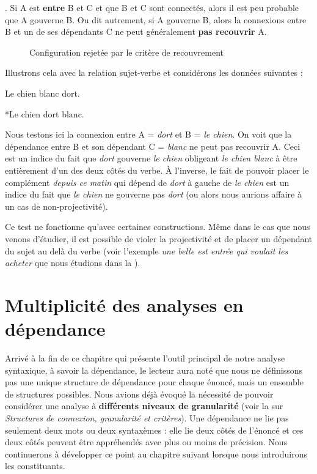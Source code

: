 \begin{styleLivreImportant}
. Si A est \textbf{entre} B et C et que B et C sont connectés, alors il est peu probable que A gouverne B. Ou dit autrement, si A gouverne B, alors la connexions entre B et un de ses dépendants C ne peut généralement \textbf{pas recouvrir} A.
\end{styleLivreImportant}

\begin{figure}

\caption{\label{fig:}Configuration rejetée par le critère de recouvrement}

\end{figure}

Illustrons cela avec la relation sujet-verbe et considérons les données suivantes :

\ea
    {Le chien blanc dort.}
    \z

    \ea
    *{Le chien dort blanc.}
\z

\z

\z

Nous testons ici la connexion entre A = \textit{dort} et B = \textit{le chien}. On voit que la dépendance entre B et son dépendant C = \textit{blanc} ne peut pas recouvrir A. Ceci est un indice du fait que \textit{dort} gouverne \textit{le chien} obligeant \textit{le chien blanc} à être entièrement d’un des deux côtés du verbe. À l’inverse, le fait de pouvoir placer le complément \textit{depuis ce matin} qui dépend de \textit{dort} à gauche de \textit{le chien} est un indice du fait que \textit{le chien} ne gouverne pas \textit{dort} (ou alors nous aurions affaire à un cas de non-projectivité).

Ce test ne fonctionne qu’avec certaines constructions. Même dans le cas que nous venons d’étudier, il est possible de violer la projectivité et de placer un dépendant du sujet au delà du verbe (voir l’exemple \textit{une belle est entrée qui voulait les acheter} que nous étudions dans la ).

\section{Multiplicité des analyses en dépendance}\label{sec:3.3.33}

Arrivé à la fin de ce chapitre qui présente l’outil principal de notre analyse syntaxique, à savoir la dépendance, le lecteur aura noté que nous ne définissons pas une unique structure de dépendance pour chaque énoncé, mais un ensemble de structures possibles. Nous avions déjà évoqué la nécessité de pouvoir considérer une analyse à \textbf{différents niveaux de granularité} (voir la  sur \textit{Structures de connexion, granularité et critères}). Une dépendance ne lie pas seulement deux mots ou deux syntaxèmes : elle lie deux côtés de l’énoncé et ces deux côtés peuvent être appréhendés avec plus ou moins de précision. Nous continuerons à développer ce point au chapitre suivant lorsque nous introduirons les constituants.

